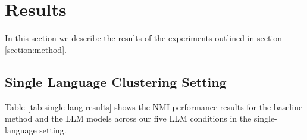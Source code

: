 \section{Results}\label{section:results}

In this section we describe the results of the experiments outlined in section \ref{section:method}.

\subsection{Single Language Clustering Setting}

Table \ref{tab:single-lang-results} shows the NMI performance results for the baseline method and the LLM models across our five LLM conditions in the single-language setting. 




